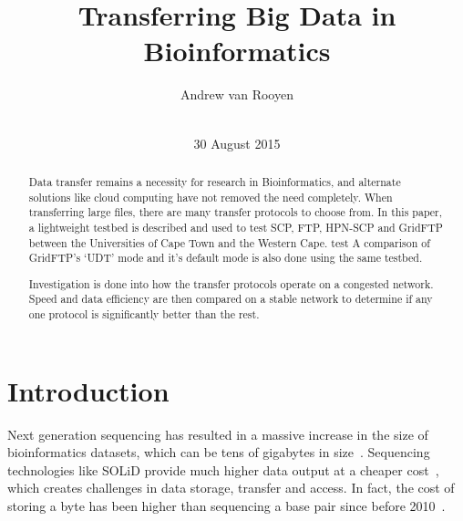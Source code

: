 \documentclass{sig-alternate-05-2015}
\begin{document}
\title{Transferring Big Data in Bioinformatics}

\author{
\alignauthor Andrew van Rooyen\\
\\
}

\date{30 August 2015}


\maketitle
\begin{abstract}
Data transfer remains a necessity for research in Bioinformatics, and alternate solutions like cloud computing have not removed the need completely. When transferring large files, there are many transfer protocols to choose from. In this paper, a lightweight testbed is described and used to test SCP, FTP, HPN-SCP and GridFTP between the Universities of Cape Town and the Western Cape.
test
A comparison of GridFTP's `UDT' mode and it's default mode is also done using the same testbed.

Investigation is done into how the transfer protocols operate on a congested network. Speed and data efficiency are then compared on a stable network to determine if any one protocol is significantly better than the rest.
\end{abstract}

\section{Introduction}
Next generation sequencing has resulted in a massive increase in the size of bioinformatics datasets, which can be tens of gigabytes in size~\cite{deorowicz2011compression}. Sequencing technologies like SOLiD provide much higher data output at a cheaper cost~\cite{shendure2008next}, which creates challenges in data storage, transfer and access. In fact, the cost of storing a byte has been higher than sequencing a base pair since before 2010~\cite{baker2010next}.
\end{document}
